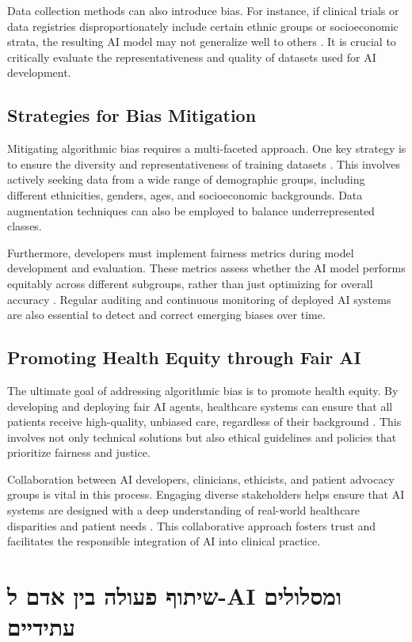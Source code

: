 \documentclass[12pt,a4paper]{article}
\begin{document}
Data collection methods can also introduce bias. For instance, if clinical trials or data registries disproportionately include certain ethnic groups or socioeconomic strata, the resulting AI model may not generalize well to others \cite{mckinney2020international}. It is crucial to critically evaluate the representativeness and quality of datasets used for AI development.

\subsection{Strategies for Bias Mitigation}
Mitigating algorithmic bias requires a multi-faceted approach. One key strategy is to ensure the diversity and representativeness of training datasets \cite{tonic.ai}. This involves actively seeking data from a wide range of demographic groups, including different ethnicities, genders, ages, and socioeconomic backgrounds. Data augmentation techniques can also be employed to balance underrepresented classes.

Furthermore, developers must implement fairness metrics during model development and evaluation. These metrics assess whether the AI model performs equitably across different subgroups, rather than just optimizing for overall accuracy \cite{wang2019deep}. Regular auditing and continuous monitoring of deployed AI systems are also essential to detect and correct emerging biases over time.

\subsection{Promoting Health Equity through Fair AI}
The ultimate goal of addressing algorithmic bias is to promote health equity. By developing and deploying fair AI agents, healthcare systems can ensure that all patients receive high-quality, unbiased care, regardless of their background \cite{nih_ethical_implications}. This involves not only technical solutions but also ethical guidelines and policies that prioritize fairness and justice.

Collaboration between AI developers, clinicians, ethicists, and patient advocacy groups is vital in this process. Engaging diverse stakeholders helps ensure that AI systems are designed with a deep understanding of real-world healthcare disparities and patient needs \cite{davenport2019ai}. This collaborative approach fosters trust and facilitates the responsible integration of AI into clinical practice.

\section{\texthebrew{שיתוף פעולה בין אדם ל-AI ומסלולים עתידיים}}
\label{sec:bidi}
\end{document}
